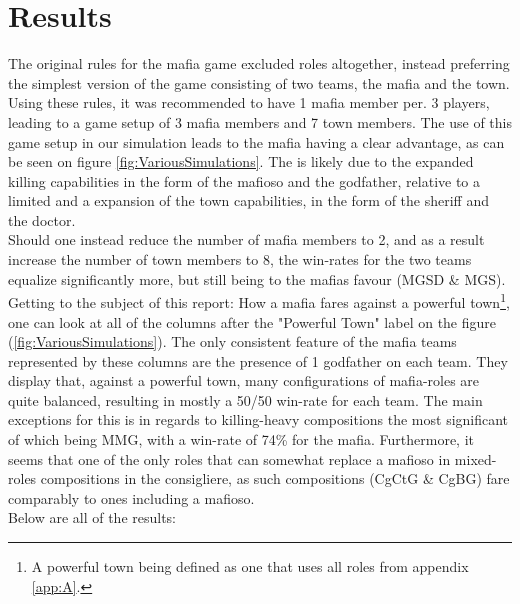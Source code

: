 \section{Results}\label{sec:results}
The original rules for the mafia game excluded roles altogether, instead 
preferring the simplest version of the game consisting of two teams, the mafia 
and the town. Using these rules\cite{MafiaRules}, it was recommended to have 1 mafia member per. 
3 players, leading to a game setup of 3 mafia members and 7 town 
members. The use of this game setup in our simulation leads to the 
mafia having a clear advantage, as can be seen on figure 
\ref{fig:VariousSimulations}. The is likely due to the expanded killing 
capabilities in the form of the mafioso and the godfather, relative to a 
limited and a expansion of the town capabilities, in the form of the sheriff 
and the doctor. \\
Should one instead reduce the number of mafia members to 2, and as a result 
increase the number of town members to 8, the win-rates for the two teams 
equalize significantly more, but still being to the mafias favour (MGSD \& 
MGS).\\
Getting to the subject of this report: How a mafia fares against a powerful 
town\footnote{A powerful town being defined as one that uses all roles 
from 
appendix \ref{app:A}.}, one can look at all of the columns after the "Powerful 
Town" label on the figure (\ref{fig:VariousSimulations}). The only consistent 
feature of the mafia teams represented by these columns are the presence of 1 
godfather on each team. They display that, against a powerful town, many 
configurations of mafia-roles are quite balanced, resulting in mostly a 50/50 
win-rate for each team. The main exceptions for this is in regards to 
killing-heavy compositions the most significant of which being MMG, with a 
win-rate of 74\% for the mafia. Furthermore, it seems that one of the only 
roles that can somewhat replace a mafioso in mixed-roles compositions in the 
consigliere, as such compositions (CgCtG \& CgBG) fare comparably to ones 
including a mafioso. \\
Below are all of the results:
